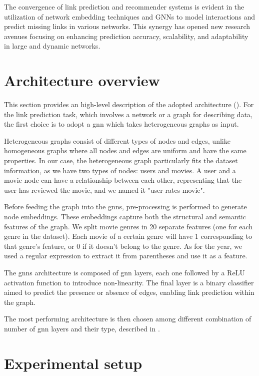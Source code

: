 \documentclass[11pt]{article}
\begin{document}
The convergence of link prediction and recommender systems is evident in the utilization of network embedding 
techniques and GNNs to model interactions and predict missing links in various networks. This synergy has opened new 
research avenues focusing on enhancing prediction accuracy, scalability, and adaptability in large and dynamic networks.

\section{Architecture overview}\label{sec:architecture-overview}

This section provides an high-level description of the adopted architecture ().
For the link prediction task, which involves a network or a graph for describing data, the first choice is to adopt a \ac{gnn} which takes heterogeneous graphs as input. 

Heterogeneous graphs consist of different types of nodes and edges, 
unlike homogeneous graphs where all nodes and edges are uniform and have the same properties.
In our case, the heterogeneous graph particularly fits the dataset information, 
as we have two types of nodes: users and movies.
A user and a movie node can have a relationship between each other, representing that the user has reviewed the movie, and we named it "user-rates-movie".

Before feeding the graph into the \acp{gnn}, pre-processing is performed to 
generate node embeddings.
These embeddings capture both the structural and semantic features of the graph.
We split movie genres in 20 separate features (one for each genre in the dataset). Each movie of a certain genre will have 1 corresponding to that genre's feature, or 0 if it doesn't belong to the genre.
As for the year, we used a regular expression to extract it from parentheses and use it as a feature.

The \acp{gnn} architecture is composed of \ac{gnn} layers, each one followed by a ReLU activation 
function to introduce non-linearity. The final layer is a binary classifier 
aimed to predict the presence or absence of edges, enabling link prediction within the 
graph.

The most performing architecture is then chosen among different combination of number of \ac{gnn} layers and their type, described in .

\section{Experimental setup}\label{sec:experimental-setup}
\end{document}

